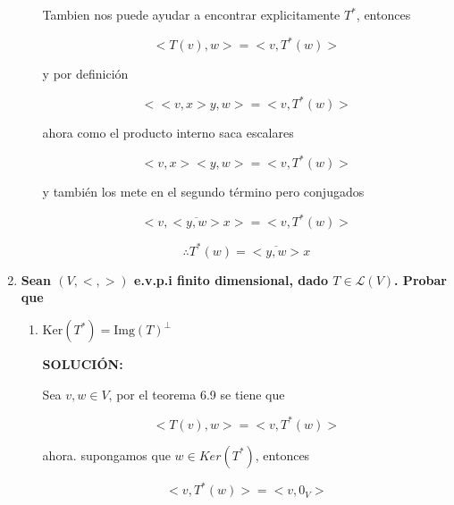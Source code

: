 \documentclass[12pt,a4paper]{article}
\begin{document}
\begin{enumerate}
\begin{enumerate}
        Tambien nos puede ayudar a encontrar explicitamente $T^{*}$, entonces
        
        \begin{equation*}
            <T(v), w> = <v, T^{*}(w)>
        \end{equation*}
        
        y por definición
        
        \begin{equation*}
            <<v,x>y,w> = <v, T^{*}(w)>
        \end{equation*}
        
        ahora como el producto interno saca escalares
        
        \begin{equation*}
            <v,x><y,w> = <v,T^{*}(w)>
        \end{equation*}
        
        y también los mete en el segundo término pero conjugados
        
        \begin{equation*}
            <v,\overline{<y,w>}x> = <v,T^{*}(w)>
        \end{equation*}
        
        \begin{equation*}
            \therefore  T^{*}(w) = \overline{<y,w>}x
        \end{equation*}
    \end{enumerate}
    
    
    
    \item \textbf{Sean $(V,<,>)$ e.v.p.i finito dimensional, dado $T \in \mathcal{L}(V)$. Probar que}
    \begin{enumerate}
        \item $\text{Ker} (T^{*}) = \text{Img}(T)^{\bot}$
        
        \textbf{SOLUCIÓN:}
        
        Sea $v,w \in V$, por el teorema 6.9 se tiene que
        
        \begin{equation*}
            <T(v), w> = <v, T^{*}(w)>
        \end{equation*}
        
        ahora. supongamos que $w \in Ker (T^{*})$, entonces 
        
        \begin{equation*}
            <v,T^{*}(w)> = <v,0_V>
        \end{equation*}
        

\end{enumerate}
\end{enumerate}
\end{document}
